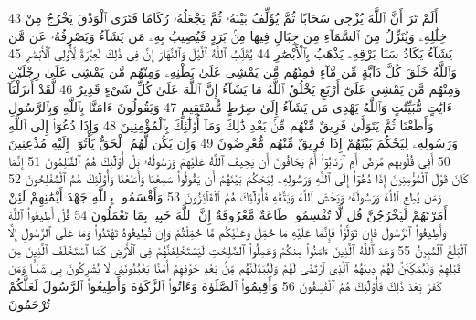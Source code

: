 {\tiny\colorbox{cl_aya}{43}} أَلَمْ تَرَ أَنَّ ٱللَّهَ يُزْجِى سَحَابًا ثُمَّ يُؤَلِّفُ بَيْنَهُۥ ثُمَّ يَجْعَلُهُۥ رُكَامًا فَتَرَى ٱلْوَدْقَ يَخْرُجُ مِنْ خِلَٰلِهِۦ وَيُنَزِّلُ مِنَ ٱلسَّمَآءِ مِن جِبَالٍ فِيهَا مِنۢ بَرَدٍ فَيُصِيبُ بِهِۦ مَن يَشَآءُ وَيَصْرِفُهُۥ عَن مَّن يَشَآءُ يَكَادُ سَنَا بَرْقِهِۦ يَذْهَبُ بِٱلْأَبْصَٰرِ
{\tiny\colorbox{cl_aya}{44}} يُقَلِّبُ ٱللَّهُ ٱلَّيْلَ وَٱلنَّهَارَ إِنَّ فِى ذَٰلِكَ لَعِبْرَةً لِّأُو۟لِى ٱلْأَبْصَٰرِ
{\tiny\colorbox{cl_aya}{45}} وَٱللَّهُ خَلَقَ كُلَّ دَآبَّةٍ مِّن مَّآءٍ فَمِنْهُم مَّن يَمْشِى عَلَىٰ بَطْنِهِۦ وَمِنْهُم مَّن يَمْشِى عَلَىٰ رِجْلَيْنِ وَمِنْهُم مَّن يَمْشِى عَلَىٰٓ أَرْبَعٍ يَخْلُقُ ٱللَّهُ مَا يَشَآءُ إِنَّ ٱللَّهَ عَلَىٰ كُلِّ شَىْءٍ قَدِيرٌ
{\tiny\colorbox{cl_aya}{46}} لَّقَدْ أَنزَلْنَآ ءَايَٰتٍ مُّبَيِّنَٰتٍ وَٱللَّهُ يَهْدِى مَن يَشَآءُ إِلَىٰ صِرَٰطٍ مُّسْتَقِيمٍ
{\tiny\colorbox{cl_aya}{47}} وَيَقُولُونَ ءَامَنَّا بِٱللَّهِ وَبِٱلرَّسُولِ وَأَطَعْنَا ثُمَّ يَتَوَلَّىٰ فَرِيقٌ مِّنْهُم مِّنۢ بَعْدِ ذَٰلِكَ وَمَآ أُو۟لَٰٓئِكَ بِٱلْمُؤْمِنِينَ
{\tiny\colorbox{cl_aya}{48}} وَإِذَا دُعُوٓا۟ إِلَى ٱللَّهِ وَرَسُولِهِۦ لِيَحْكُمَ بَيْنَهُمْ إِذَا فَرِيقٌ مِّنْهُم مُّعْرِضُونَ
{\tiny\colorbox{cl_aya}{49}} وَإِن يَكُن لَّهُمُ ٱلْحَقُّ يَأْتُوٓا۟ إِلَيْهِ مُذْعِنِينَ
{\tiny\colorbox{cl_aya}{50}} أَفِى قُلُوبِهِم مَّرَضٌ أَمِ ٱرْتَابُوٓا۟ أَمْ يَخَافُونَ أَن يَحِيفَ ٱللَّهُ عَلَيْهِمْ وَرَسُولُهُۥ بَلْ أُو۟لَٰٓئِكَ هُمُ ٱلظَّٰلِمُونَ
{\tiny\colorbox{cl_aya}{51}} إِنَّمَا كَانَ قَوْلَ ٱلْمُؤْمِنِينَ إِذَا دُعُوٓا۟ إِلَى ٱللَّهِ وَرَسُولِهِۦ لِيَحْكُمَ بَيْنَهُمْ أَن يَقُولُوا۟ سَمِعْنَا وَأَطَعْنَا وَأُو۟لَٰٓئِكَ هُمُ ٱلْمُفْلِحُونَ
{\tiny\colorbox{cl_aya}{52}} وَمَن يُطِعِ ٱللَّهَ وَرَسُولَهُۥ وَيَخْشَ ٱللَّهَ وَيَتَّقْهِ فَأُو۟لَٰٓئِكَ هُمُ ٱلْفَآئِزُونَ
{\tiny\colorbox{cl_aya}{53}} وَأَقْسَمُوا۟ بِٱللَّهِ جَهْدَ أَيْمَٰنِهِمْ لَئِنْ أَمَرْتَهُمْ لَيَخْرُجُنَّ قُل لَّا تُقْسِمُوا۟ طَاعَةٌ مَّعْرُوفَةٌ إِنَّ ٱللَّهَ خَبِيرٌۢ بِمَا تَعْمَلُونَ
{\tiny\colorbox{cl_aya}{54}} قُلْ أَطِيعُوا۟ ٱللَّهَ وَأَطِيعُوا۟ ٱلرَّسُولَ فَإِن تَوَلَّوْا۟ فَإِنَّمَا عَلَيْهِ مَا حُمِّلَ وَعَلَيْكُم مَّا حُمِّلْتُمْ وَإِن تُطِيعُوهُ تَهْتَدُوا۟ وَمَا عَلَى ٱلرَّسُولِ إِلَّا ٱلْبَلَٰغُ ٱلْمُبِينُ
{\tiny\colorbox{cl_aya}{55}} وَعَدَ ٱللَّهُ ٱلَّذِينَ ءَامَنُوا۟ مِنكُمْ وَعَمِلُوا۟ ٱلصَّٰلِحَٰتِ لَيَسْتَخْلِفَنَّهُمْ فِى ٱلْأَرْضِ كَمَا ٱسْتَخْلَفَ ٱلَّذِينَ مِن قَبْلِهِمْ وَلَيُمَكِّنَنَّ لَهُمْ دِينَهُمُ ٱلَّذِى ٱرْتَضَىٰ لَهُمْ وَلَيُبَدِّلَنَّهُم مِّنۢ بَعْدِ خَوْفِهِمْ أَمْنًا يَعْبُدُونَنِى لَا يُشْرِكُونَ بِى شَيْـًٔا وَمَن كَفَرَ بَعْدَ ذَٰلِكَ فَأُو۟لَٰٓئِكَ هُمُ ٱلْفَٰسِقُونَ
{\tiny\colorbox{cl_aya}{56}} وَأَقِيمُوا۟ ٱلصَّلَوٰةَ وَءَاتُوا۟ ٱلزَّكَوٰةَ وَأَطِيعُوا۟ ٱلرَّسُولَ لَعَلَّكُمْ تُرْحَمُونَ
